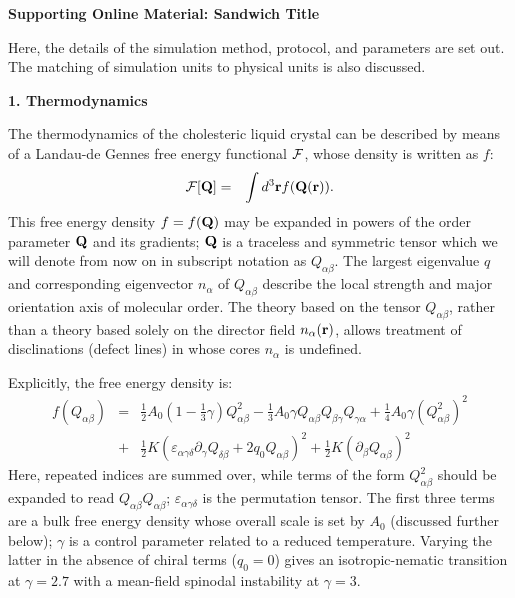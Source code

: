 \documentclass[12pt,twoside]{article}
\begin{document}
{\bf Supporting Online Material: Sandwich Title}

Here, the details of the simulation method, protocol, and parameters are
set out. The matching of simulation units to physical units is also
discussed.

{\bf 1. Thermodynamics}

The thermodynamics of the cholesteric liquid crystal can be described
by means of a  Landau-de Gennes free energy functional $\cal F$,
whose density is written as $f$:
\begin{eqnarray}
{\cal F}[{\bf Q}]&=&\int d^3{\bf r} f({\bf Q}({\bf r})).
\end{eqnarray}
This free energy density $f = f({\bf Q})$ may be expanded in powers of the
order parameter ${\bf Q}$ and its gradients; ${\bf Q}$ is a traceless 
and symmetric tensor which we will denote from now on in subscript
notation as $Q_{\alpha\beta}$.
The largest eigenvalue $q$ and corresponding eigenvector $n_\alpha$
of $Q_{\alpha\beta}$ describe the local strength and major orientation axis
of molecular order.
The theory based on the tensor $Q_{\alpha\beta}$, rather than a theory based
solely
on the director field $n_\alpha ({\bf r})$, allows treatment of disclinations
(defect lines) in whose cores $n_\alpha$ is undefined.

Explicitly, the free energy density is:
\begin{eqnarray}
f(Q_{\alpha\beta}) &=& {\textstyle \frac{1}{2}} A_0
 \left(1- {\textstyle \frac{1}{3}}\gamma \right)Q^2_{\alpha \beta}
-{\textstyle \frac{1}{3}}A_0\gamma Q_{\alpha \beta} Q_{\beta \gamma}Q_{\gamma \alpha} 
+ {\textstyle \frac{1}{4}} A_0\gamma (Q^2_{\alpha \beta})^2  \nonumber\\
&+& {\textstyle \frac{1}{2}} K(\varepsilon_{\alpha \gamma \delta}
\partial_\gamma Q_{\delta \beta} + 2 q_0 Q_{\alpha \beta})^2
+ {\textstyle \frac{1}{2}} K (\partial_\beta Q_{\alpha \beta})^2
\label{free}
\end{eqnarray}
Here, repeated indices are summed over, while terms of the form
$Q^2_{\alpha\beta}$ should be expanded to read $Q_{\alpha\beta}Q_{\alpha\beta}$;
$\varepsilon_{\alpha\gamma\delta}$ is the permutation tensor.
The first three terms are a bulk free energy density whose overall scale
is set by $A_0$ (discussed further below); $\gamma$ is a control parameter
related to a reduced temperature. Varying the latter in the absence of
chiral terms ($q_0=0$) gives an isotropic-nematic transition at
$\gamma = 2.7$ with a mean-field spinodal instability at $\gamma = 3$.
\end{document}
